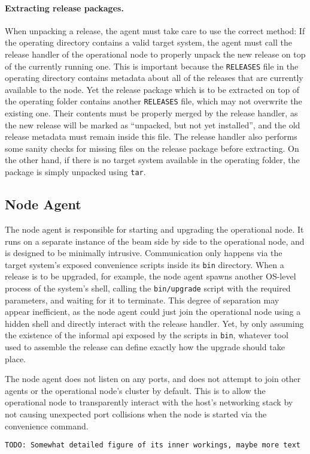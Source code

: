 \paragraph{Extracting release packages.}
When unpacking a release, the agent must take care to use the correct method: If the operating directory contains a valid target system, the agent must call the release handler of the operational node to properly unpack the new release on top of the currently running one. This is important because the \lstinline|RELEASES| file in the operating directory contains metadata about all of the releases that are currently available to the node. Yet the release package which is to be extracted on top of the operating folder contains another \lstinline|RELEASES| file, which may not overwrite the existing one. Their contents must be properly merged by the release handler, as the new release will be marked as ``unpacked, but not yet installed'', and the old release metadata must remain inside this file. The release handler also performs some sanity checks for missing files on the release package before extracting. On the other hand, if there is no target system available in the operating folder, the package is simply unpacked using \lstinline|tar|.

\cleardoublepage
\subsection{Node Agent}
The node agent is responsible for starting and upgrading the operational node. It runs on a separate instance of the \acrshort{beam} side by side to the operational node, and is designed to be minimally intrusive. Communication only happens via the target system's exposed convenience scripts inside its \lstinline|bin| directory. When a release is to be upgraded, for example, the node agent spawns another OS-level process of the system's shell, calling the \lstinline|bin/upgrade| script with the required parameters, and waiting for it to terminate. This
degree of separation may appear inefficient, as the node agent could just join the operational node using a hidden shell and directly interact with the release handler. Yet, by only assuming the existence of the informal \acrshort{api} exposed by the scripts in \lstinline|bin|, whatever tool used to assemble the release can define exactly how the upgrade should take place.

The node agent does not listen on any ports, and does not attempt to join other agents or the operational node's cluster by default. This is to allow the operational node to transparently interact with the host's networking stack by not causing unexpected port collisions when the node is started via the convenience command.

\lstinline|TODO: Somewhat detailed figure of its inner workings, maybe more text|